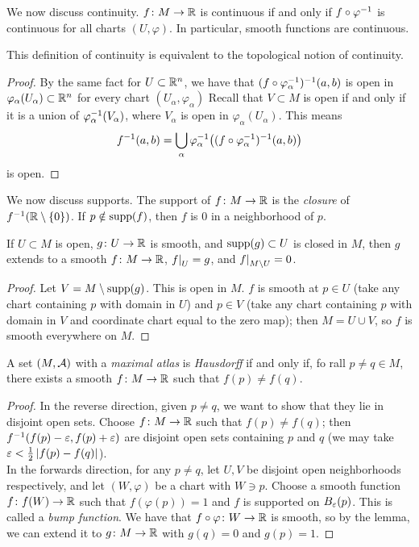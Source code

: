 We now discuss continuity. $f \colon M \to \mathbb R$ is continuous if and only if $f \circ \varphi^{-1}$ is continuous for all charts $(U, \varphi)$. In particular, smooth functions are continuous.
\begin{proposition}
    This definition of continuity is equivalent to the topological notion of continuity.
\end{proposition}
\begin{proof}
    By the same fact for $U \subset \mathbb R^n$, we have that $(f \circ \varphi_\alpha^{-1})^{-1}(a, b)$ is open in $\varphi_\alpha(U_\alpha) \subset \mathbb R^n$ for every chart $(U_\alpha, \varphi_\alpha)$ Recall that $V \subset M$ is open if and only if it is a union of $\varphi_\alpha^{-1}(V_\alpha)$, where $V_\alpha$ is open in $\varphi_\alpha(U_\alpha)$. This means
    \[ f^{-1}(a, b) = \bigcup_\alpha \varphi_\alpha^{-1}\bigl((f \circ \varphi_\alpha^{-1})^{-1} (a, b)\bigr) \]
    is open.
\end{proof}
We now discuss supports. The support of $f \colon M \to \mathbb R$ is the \textit{closure} of $f^{-1}(\mathbb R \setminus \{0\})$. If $p \notin \operatorname{supp}(f)$, then $f$ is $0$ in a neighborhood of $p$.
\begin{lemma}
    If $U \subset M$ is open, $g \colon U \to \mathbb R$ is smooth, and $\operatorname{supp}(g) \subset U$ is closed in $M$, then $g$ extends to a smooth $f \colon M \to \mathbb R$, $\restr{f}{U} = g$, and $\restr{f}{M \setminus U} = 0$.
\end{lemma}
\begin{proof}
    Let $V = M \setminus \operatorname{supp}(g)$. This is open in $M$. $f$ is smooth at $p \in U$ (take any chart containing $p$ with domain in $U$) and $p \in V$ (take any chart containing $p$ with domain in $V$ and coordinate chart equal to the zero map); then $M = U \cup V$, so $f$ is smooth everywhere on $M$.
\end{proof}
\begin{proposition}
    A set $(M, \mathcal A)$ with a \textit{maximal atlas} is \textit{Hausdorff} if and only if, fo rall $p \neq q \in M$, there exists a smooth $f \colon M \to \mathbb R$ such that $f(p) \neq f(q)$.
\end{proposition}
\begin{proof}
    In the reverse direction, given $p \neq q$, we want to show that they lie in disjoint open sets. Choose $f \colon M \to \mathbb R$ such that $f(p) \neq f(q)$; then $f^{-1}(f(p) - \varepsilon, f(p) + \varepsilon)$ are disjoint open sets containing $p$ and $q$ (we may take $\varepsilon < \frac{1}{2} \left\lvert f(p) - f(q) \right\rvert$).
    \\[8pt]
    In the forwards direction, for any $p \neq q$, let $U, V$ be disjoint open neighborhoods respectively, and let $(W, \varphi)$ be a chart with $W \ni p$. Choose a smooth function $f \colon f(W) \to \mathbb R$ such that $f(\varphi(p)) = 1$ and $f$ is supported on $B_\varepsilon(p)$. This is called a \textit{bump function}. We have that $f \circ \varphi \colon W \to \mathbb R$ is smooth, so by the lemma, we can extend it to $g \colon M \to \mathbb R$ with $g(q) = 0$ and $g(p) = 1$.
\end{proof}
